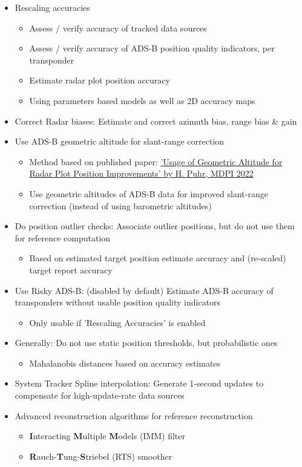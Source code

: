 \begin{itemize}
\begin{itemize}
\item Rescaling accuracies
\begin{itemize}
\item Assess / verify accuracy of tracked data sources
\item Assess / verify accuracy of ADS-B position quality indicators, per transponder
\item Estimate radar plot position accuracy
\item Using parameters based models as well as 2D accuracy maps
\end{itemize}
\item Correct Radar biases: Estimate and correct azimuth bias, range bias \& gain
\item Use ADS-B geometric altitude for slant-range correction
\begin{itemize}
\item Method based on published paper: \href{https://doi.org/10.3390/engproc2022028008}{'Usage of Geometric Altitude for Radar Plot Position Improvements' by H. Puhr, MDPI 2022}
\item Use geometric altitudes of ADS-B data for improved slant-range correction (instead of using barometric altitudes)
\end{itemize}
\item Do position outlier checks: Associate outlier positions, but do not use them for reference computation
\begin{itemize}
\item Based on estimated target position estimate accuracy and (re-scaled) target report accuracy
\end{itemize}
\item Use Risky ADS-B: (disabled by default) Estimate ADS-B accuracy of transponders without usable position quality indicators
\begin{itemize}
\item Only usable if 'Rescaling Accuracies' is enabled
\end{itemize}
\item Generally: Do not use static position thresholds, but probabilistic ones
\begin{itemize}
\item Mahalanobis distances based on accuracy estimates
\end{itemize}
\item System Tracker Spline interpolation: Generate 1-second updates to compensate for high-update-rate data sources
\item Advanced reconstruction algorithms for reference reconstruction
\begin{itemize}
\item \textbf{I}nteracting \textbf{M}ultiple \textbf{M}odels (IMM) filter
\item \textbf{R}auch-\textbf{T}ung-\textbf{S}triebel (RTS) smoother
\end{itemize}
\end{itemize}



\end{itemize}
